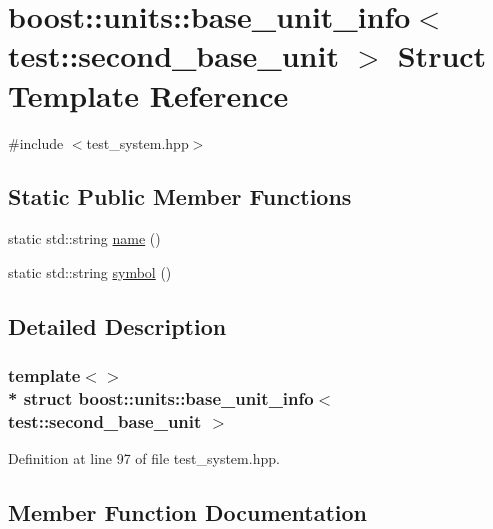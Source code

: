 \hypertarget{structboost_1_1units_1_1base__unit__info_3_01test_1_1second__base__unit_01_4}{}\section{boost\+:\+:units\+:\+:base\+\_\+unit\+\_\+info$<$ test\+:\+:second\+\_\+base\+\_\+unit $>$ Struct Template Reference}
\label{structboost_1_1units_1_1base__unit__info_3_01test_1_1second__base__unit_01_4}


{\ttfamily \#include $<$test\+\_\+system.\+hpp$>$}

\subsection*{Static Public Member Functions}
\begin{DoxyCompactItemize}
\item 
static std\+::string \hyperlink{structboost_1_1units_1_1base__unit__info_3_01test_1_1second__base__unit_01_4_acac875cfe3ef9e57e1d655f5e69905e7}{name} ()
\item 
static std\+::string \hyperlink{structboost_1_1units_1_1base__unit__info_3_01test_1_1second__base__unit_01_4_a267bcda417a856d52f1e5efd8ab9de23}{symbol} ()
\end{DoxyCompactItemize}


\subsection{Detailed Description}
\subsubsection*{template$<$$>$\\*
struct boost\+::units\+::base\+\_\+unit\+\_\+info$<$ test\+::second\+\_\+base\+\_\+unit $>$}



Definition at line 97 of file test\+\_\+system.\+hpp.



\subsection{Member Function Documentation}

